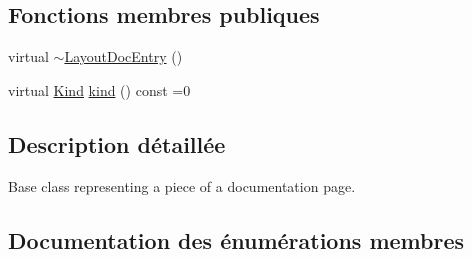 \subsection*{Fonctions membres publiques}
\begin{DoxyCompactItemize}
\item 
virtual \hyperlink{struct_layout_doc_entry_aababb2177bde8020545fe2c57115a9cb}{$\sim$\+Layout\+Doc\+Entry} ()
\item 
virtual \hyperlink{struct_layout_doc_entry_a89dcbe762ed7e7f7790d8c034cf8ea01}{Kind} \hyperlink{struct_layout_doc_entry_af0444e15120e40ca9b2edadcec05ae47}{kind} () const  =0
\end{DoxyCompactItemize}


\subsection{Description détaillée}
Base class representing a piece of a documentation page. 

\subsection{Documentation des énumérations membres}
\hypertarget{struct_layout_doc_entry_a89dcbe762ed7e7f7790d8c034cf8ea01}{}
